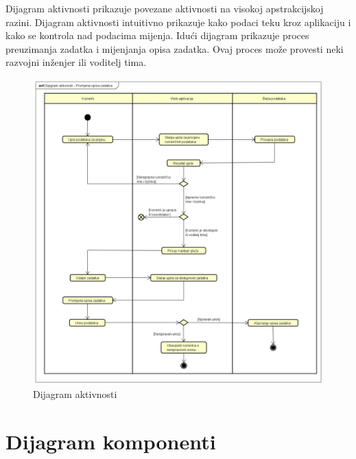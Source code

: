 			Dijagram aktivnosti prikazuje povezane aktivnosti na visokoj apstrakcijskoj razini. Dijagram aktivnosti intuitivno prikazuje kako podaci teku kroz aplikaciju i kako se kontrola nad podacima mijenja. Idući dijagram prikazuje proces preuzimanja zadatka i mijenjanja opisa zadatka. Ovaj proces može provesti neki razvojni inženjer ili voditelj tima.
			\begin{figure}[H]
				\includegraphics[width=\textwidth]{slike/dijagram_aktivnosti.png}
				\centering
				\caption{Dijagram aktivnosti}
				\label{fig:classd_middle}
			\end{figure}
			
			\eject
		
		\section{Dijagram komponenti}
		
